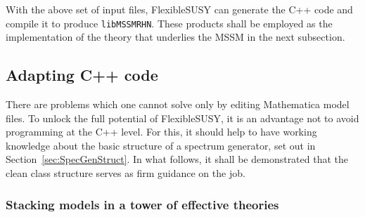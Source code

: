 \documentclass[final,3p,11pt,pdflatex]{elsarticle}
\makeatletter
\newcommand{\fs}{FlexibleSUSY\@\xspace}
\newcommand{\mathematica}{Mathematica\xspace}
\newcommand{\code}[1]{\lstinline|#1|}  %
\newcommand{\secref}[1]{Section~\ref{#1}}
\makeatother
\begin{document}
With the above set of input files,
\fs can generate the C++ code and compile it
to produce \code{libMSSMRHN}.
These products shall be employed as the implementation of the theory that
underlies the MSSM in the next subsection.

\subsection{Adapting C++ code}
\label{sec:adapting-cpp-code}

There are problems which one cannot solve only by
editing \mathematica model files.
To unlock the full potential of \fs,
it is an advantage not to avoid programming at the C++ level.
For this, it should help to have working knowledge about the basic structure
of a spectrum generator, set out in \secref{sec:SpecGenStruct}.
In what follows,
it shall be demonstrated that
the clean class structure serves as firm guidance on the job.

\subsubsection{Stacking models in a tower of effective theories}
\label{sec:tower construction}
\end{document}
